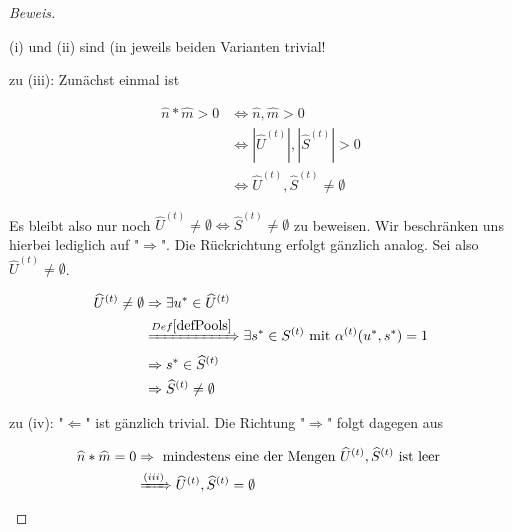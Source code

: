 \begin{proof}[Beweis] \textrm{ }

\vspace{0.3cm}

(i) und (ii) sind (in jeweils beiden Varianten trivial!

\vspace{0.3cm}

zu (iii): Zunächst einmal ist

\begin{align*}
\widehat{n} * \widehat{m} > 0 &\Leftrightarrow \widehat{n}, \widehat{m} > 0 \\
&\Leftrightarrow |\widehat{U}^{(t)}|, |\widehat{S}^{(t)}| > 0 \\
&\Leftrightarrow \widehat{U}^{(t)}, \widehat{S}^{(t)} \neq \emptyset
\end{align*}

\vspace{0.3cm}

Es bleibt also nur noch $\widehat{U}^{(t)} \neq \emptyset \Leftrightarrow \widehat{S}^{(t)} \neq \emptyset$ zu beweisen. Wir beschränken uns hierbei lediglich auf "$\Rightarrow$". Die Rückrichtung erfolgt gänzlich analog. Sei also $\widehat{U}^{(t)} \neq \emptyset$.

\begin{align*}
\widehat{U}^{(t)} \neq \emptyset &\Rightarrow \exists u^{*} \in \widehat{U}^{(t)} \\
&\xRightarrow{Def \ref{defPools}} \exists s^{*} \in S^{(t)} \textrm{ mit } \alpha^{(t)}(u^{*}, s^{*}) = 1 \\
&\Rightarrow s^{*} \in \widehat{S}^{(t)} \\
&\Rightarrow \widehat{S}^{(t)} \neq \emptyset
\end{align*}

\vspace{0.3cm}

zu (iv): 
"$\Leftarrow$" ist gänzlich trivial. Die Richtung "$\Rightarrow$" folgt dagegen aus

\begin{align*}
\widehat{n} * \widehat{m} = 0 &\Rightarrow \textrm{ mindestens eine der Mengen } \widehat{U}^{(t)}, \widehat{S}^{(t)} \textrm{ ist leer } \\
&\xRightarrow{(iii)}  \widehat{U}^{(t)}, \widehat{S}^{(t)} = \emptyset
\end{align*}
  
\end{proof}


